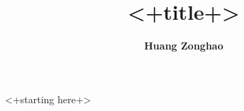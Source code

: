 \documentclass[draft, 11pt, letterpaper]{article}
\begin{document}
\title{\textbf {<+title+>}}
\author{\textbf{Huang Zonghao}}
\maketitle
<+starting here+>

\end{document}
